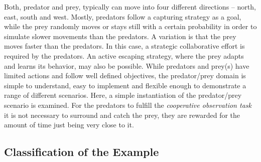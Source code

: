 Both, predator and prey, typically can move into four different directions -- north, east, south and west. Mostly, predators follow a capturing strategy as a goal, while the prey randomly moves or stays still with a certain probability in order to simulate slower movements than the predators. A variation is that the prey moves faster than the predators. In this case, a strategic collaborative effort is required by the predators. An active escaping strategy, where the prey adapts and learns its behavior, may also be possible.
While predators and prey(s) have limited actions and follow well defined objectives, the predator/prey domain is simple to understand, easy to implement and flexible enough to demonstrate a range of different scenarios. %
Here, a simple instantiation of the predator/prey scenario is examined. 
For the predators to fulfill the \emph{cooperative observation task} it is not necessary to surround and catch the prey, they are rewarded for the amount of time just being very close to it.

\subsection{Classification of the Example}
\label{subsection:scenario-classification}

